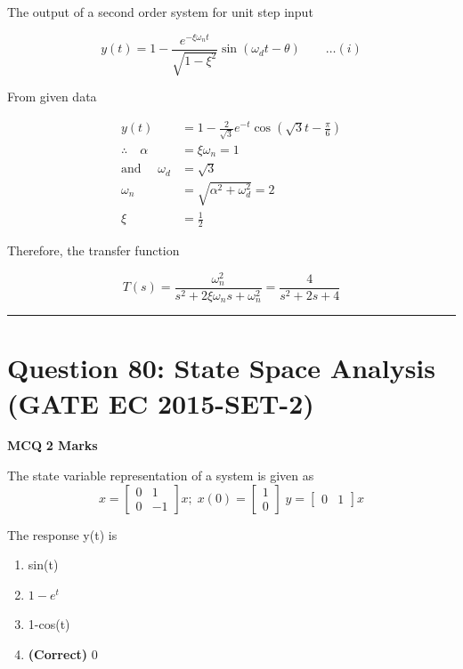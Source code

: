 \documentclass[11pt,a4paper]{article}
\begin{document}
\begin{tcolorbox}[solbox, title=Detailed Solution -- Question 79]
The output of a second order system for unit step 
 input

\[
y(t)=1-\frac{e^{-\xi \omega_{n} t}}{\sqrt{1-\xi^{2}}} \sin \left(\omega_{d} t-\theta\right) \qquad\ldots(i)
\]

 From given data

\[
\begin{aligned} y(t)&=1-\frac{2}{\sqrt{3}} e^{-t} \cos \left(\sqrt{3} t-\frac{\pi}{6}\right)\\ \therefore \quad \alpha&=\xi \omega_{n}=1 \\ \text{and }\quad \omega_{d}&=\sqrt{3} \\ \omega_{n}&=\sqrt{\alpha^{2}+\omega_{d}^{2}}=2 \\ \xi&=\frac{1}{2} \end{aligned}
\]

 Therefore, the transfer function

\[
T(s)=\frac{\omega_{n}^{2}}{s^{2}+2 \xi \omega_{n} s+\omega_{n}^{2}}=\frac{4}{s^{2}+2 s+4}
\]
\end{tcolorbox}

\vspace{1.5em}
\hrule
\vspace{1.5em}

\section*{Question 80: State Space Analysis (GATE EC 2015-SET-2)}
\noindent \textbf{\color{primary}MCQ} \hfill \textbf{\color{secondary}2 Marks}


\noindent The state variable representation of a system is given as 
\[
x=\begin{bmatrix} 0 & 1\\ 0&-1 \end{bmatrix}x; \; x(0)=\begin{bmatrix} 1\\ 0 \end{bmatrix} \; y= \begin{bmatrix} 0 &1 \end{bmatrix}x
\]

 The response y(t) is


\begin{enumerate}[label=(\Alph*)]
    \item sin(t)
    \item $1-e^{t}$
    \item 1-cos(t)
    \item \textbf{(Correct)} 0
\end{enumerate}
\end{document}
